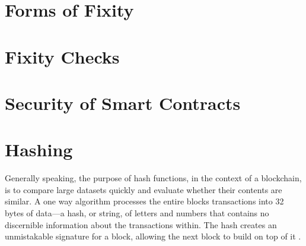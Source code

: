 \section{Forms of Fixity}
\section{Fixity Checks}
\section{Security of Smart Contracts}
\section{Hashing}
Generally speaking, the purpose of hash functions, in the context of a blockchain, is to compare large datasets quickly and evaluate whether their contents are similar. A one way algorithm processes the entire blocks transactions into 32 bytes of data—a hash, or string, of letters and numbers that contains no discernible information about the transactions within. The hash creates an unmistakable signature for a block, allowing the next block to build on top of it \cite[55]{dannen2017introducing}.